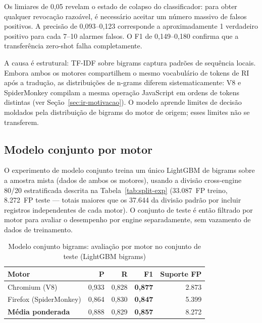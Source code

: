 Os limiares de 0,05 revelam o estado de colapso do classificador: para obter
qualquer revocação razoável, é necessário aceitar um número massivo de falsos
positivos. A precisão de 0,093--0,123 corresponde a aproximadamente 1 verdadeiro
positivo para cada 7--10 alarmes falsos. O F1 de 0,149--0,180 confirma que a
transferência zero-shot falha completamente.

A causa é estrutural: TF-IDF sobre bigrams captura padrões de sequência locais.
Embora ambos os motores compartilhem o mesmo vocabulário de tokens de RI após a
tradução, as distribuições de n-grams diferem sistematicamente: V8 e
SpiderMonkey compilam a mesma operação JavaScript em ordens de tokens distintas
(ver Seção~\ref{sec:ir-motivacao}). O modelo aprende limites de decisão moldados
pela distribuição de bigrams do motor de origem; esses limites não se transferem.

\subsection{Modelo conjunto por motor}
\label{sub:conjunto}

O experimento de modelo conjunto treina um único LightGBM de bigrams sobre a
amostra mista (dados de ambos os motores), usando a divisão cross-engine 80/20
estratificada descrita na Tabela~\ref{tab:split-exp} (33.087~FP treino, 8.272~FP
teste — totais maiores que os 37.644 da divisão padrão por incluir registros
independentes de cada motor). O conjunto de teste é então filtrado por
motor para avaliar o desempenho por engine separadamente, sem vazamento de dados de
treinamento.

\begin{table}[htb]
\centering
\caption{Modelo conjunto bigrams: avaliação por motor no conjunto de teste (LightGBM bigrams)}
\label{tab:conjunto}
\begin{tabular}{lrrrr}
\toprule
\textbf{Motor} & \textbf{P} & \textbf{R} & \textbf{F1} & \textbf{Suporte FP} \\
\midrule
Chromium (V8)            & 0,933 & 0,828 & \textbf{0,877} & 2.873 \\
Firefox (SpiderMonkey)   & 0,864 & 0,830 & \textbf{0,847} & 5.399 \\
\midrule
\textbf{Média ponderada} & 0,888 & 0,829 & \textbf{0,857} & 8.272 \\
\bottomrule
\end{tabular}

\end{table}


